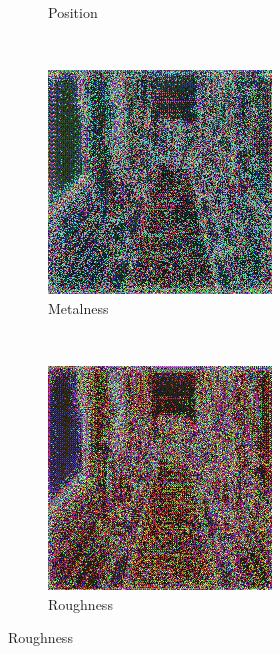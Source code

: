 \begin{figure}[h!]
\begin{subfigure}[b]{0.175\textwidth}
     \caption{Position}\label{subfig:1}
    \end{subfigure}
    ~
    \begin{subfigure}[b]{0.175\textwidth}
     \includegraphics[width=\textwidth]{figures/result/quadruple/albedo_normal_emissive_metalness/2.png}
     \caption{Metalness}
    \end{subfigure}
    ~
    \begin{subfigure}[b]{0.175\textwidth}
     \includegraphics[width=\textwidth]{figures/result/quadruple/depth_albedo_normal_roughness/2.png}
     \caption{Roughness}
    \end{subfigure}
    

\end{figure}
